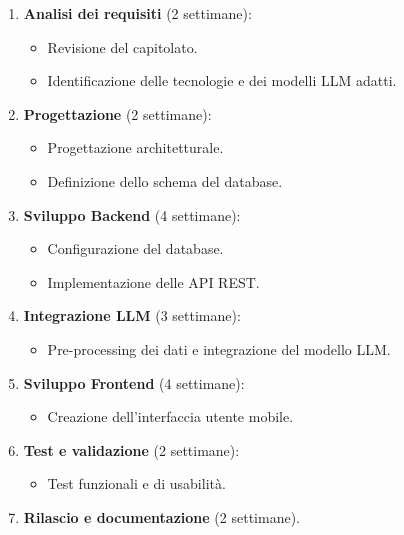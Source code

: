\documentclass{article}
\begin{document}
        \begin{enumerate}
            \item \textbf{Analisi dei requisiti} (2 settimane):
            \begin{itemize}
                \item Revisione del capitolato.
                \item Identificazione delle tecnologie e dei modelli LLM adatti.
            \end{itemize}
            \item \textbf{Progettazione} (2 settimane):
            \begin{itemize}
                \item Progettazione architetturale.
                \item Definizione dello schema del database.
            \end{itemize}
            \item \textbf{Sviluppo Backend} (4 settimane):
            \begin{itemize}
                \item Configurazione del database.
                \item Implementazione delle API REST.
            \end{itemize}
            \item \textbf{Integrazione LLM} (3 settimane):
            \begin{itemize}
                \item Pre-processing dei dati e integrazione del modello LLM.
            \end{itemize}
            \item \textbf{Sviluppo Frontend} (4 settimane):
            \begin{itemize}
                \item Creazione dell'interfaccia utente mobile.
            \end{itemize}
            \item \textbf{Test e validazione} (2 settimane):
            \begin{itemize}
                \item Test funzionali e di usabilità.
            \end{itemize}
            \item \textbf{Rilascio e documentazione} (2 settimane).
        \end{enumerate}
\end{document}
